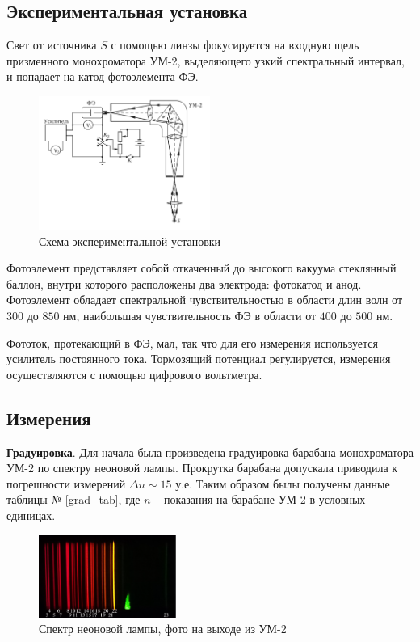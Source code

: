 \subsection*{Экспериментальная установка}


Свет от источника $S$ с помощью линзы фокусируется на входную щель призменного монохроматора УМ-2, выделяющего узкий спектральный интервал, и попадает на катод фотоэлемента ФЭ.
\begin{figure}[h]
    \centering
    \includegraphics[width=0.5\textwidth]{imgs/exp.png}
    \caption{Схема экспериментальной установки}
    \label{fig:exp}
\end{figure}
Фотоэлемент представляет собой откаченный до высокого вакуума стеклянный баллон, внутри которого расположены два электрода: фотокатод и анод. Фотоэлемент обладает спектральной чувствительностью в области длин волн от $300$ до $850$ нм, наибольшая чувствительность ФЭ в области от $400$ до $500$ нм. 

Фототок, протекающий в ФЭ, мал, так что для его измерения используется усилитель постоянного тока. Тормозящий потенциал регулируется, измерения осуществляются с помощью цифрового вольтметра.



\newpage


\subsection*{Измерения}

\textbf{Градуировка}. Для начала была произведена градуировка барабана монохроматора УМ-2 по спектру неоновой лампы. Прокрутка барабана допускала приводила к погрешности измерений $\Delta n \sim 15$ у.е. Таким образом былы получены данные таблицы № \ref{grad_tab}, где $n$ -- показания на барабане УМ-2 в условных единицах.



\begin{figure}[ht]
    \centering
    \includegraphics[width=0.4\textwidth]{figs/photo_1.pdf}
    \caption{Спектр неоновой лампы, фото на выходе из УМ-2}
\end{figure}



